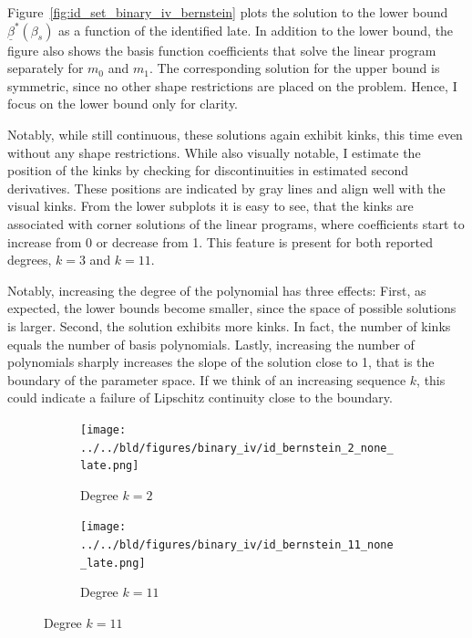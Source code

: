 \documentclass[12pt,a4paper,english]{article} %
\numberwithin{equation}{section}
\theoremstyle{definition}
\theoremstyle{remark}
\theoremstyle{plain}
\begin{document}
Figure~\ref{fig:id_set_binary_iv_bernstein} plots the solution to the lower bound $\underline{\beta}^*(\beta_s)$ as a function of the identified late.
In addition to the lower bound, the figure also shows the basis function coefficients that solve the linear program separately for $m_0$ and $m_1$.
The corresponding solution for the upper bound is symmetric, since no other shape restrictions are placed on the problem. Hence, I focus on the lower bound only for clarity.

Notably, while still continuous, these solutions again exhibit kinks, this time even without any shape restrictions.
While also visually notable, I estimate the position of the kinks by checking for discontinuities in estimated second derivatives.
These positions are indicated by gray lines and align well with the visual kinks.
From the lower subplots it is easy to see, that the kinks are associated with corner solutions of the linear programs, where coefficients start to increase from 0 or decrease from 1.
This feature is present for both reported degrees, $k=3$ and $k=11$.

Notably, increasing the degree of the polynomial has three effects:
First, as expected, the lower bounds become smaller, since the space of possible solutions is larger.
Second, the solution exhibits more kinks. In fact, the number of kinks equals the number of basis polynomials.
Lastly, increasing the number of polynomials sharply increases the slope of the solution close to 1, that is the boundary of the parameter space.
If we think of an increasing sequence $k$, this could indicate a failure of Lipschitz continuity close to the boundary.

\begin{figure}

  \caption{Identified Sets for the Binary-IV Model with Bernstein Polynomial MTRs}\label{fig:id_set_binary_iv_bernstein}

  \centering
  \begin{subfigure}[b]{0.49\textwidth}
      \centering
      \texttt{[image: ../../bld/figures/binary\_iv/id\_bernstein\_2\_none\_late.png]}
      \caption{Degree $k=2$}\label{fig:id_set_binary_iv_bernstein_k_2}
  \end{subfigure}
  \hfill
  \begin{subfigure}[b]{0.49\textwidth}
      \centering
      \texttt{[image: ../../bld/figures/binary\_iv/id\_bernstein\_11\_none\_late.png]}
      \caption{Degree $k=11$}\label{fig:id_set_binary_iv_bernstein_k_11}
  \end{subfigure}
\end{figure}
\end{document}
